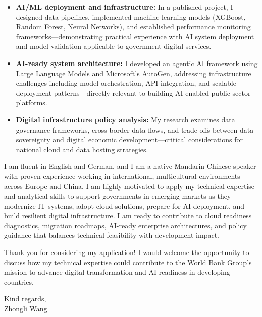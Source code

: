 \documentclass[11pt]{article}
\begin{document}
\begin{itemize}
    \item \textbf{AI/ML deployment and infrastructure:} In a published project, I designed data pipelines, implemented machine learning models (XGBoost, Random Forest, Neural Networks), and established performance monitoring frameworks—demonstrating practical experience with AI system deployment and model validation applicable to government digital services.
    \item \textbf{AI-ready system architecture:} I developed an agentic AI framework using Large Language Models and Microsoft's AutoGen, addressing infrastructure challenges including model orchestration, API integration, and scalable deployment patterns—directly relevant to building AI-enabled public sector platforms.
    \item \textbf{Digital infrastructure policy analysis:} My research examines data governance frameworks, cross-border data flows, and trade-offs between data sovereignty and digital economic development—critical considerations for national cloud and data hosting strategies.
\end{itemize}

I am fluent in English and German, and I am a native Mandarin Chinese speaker with proven experience working in international, multicultural environments across Europe and China. 
I am highly motivated to apply my technical expertise and analytical skills to support governments in emerging markets as they modernize IT systems, adopt cloud solutions, prepare for AI deployment, and build resilient digital infrastructure. 
I am ready to contribute to cloud readiness diagnostics, migration roadmaps, AI-ready enterprise architectures, and policy guidance that balances technical feasibility with development impact.

Thank you for considering my application! 
I would welcome the opportunity to discuss how my technical expertise could contribute to the World Bank Group's mission to advance digital transformation and AI readiness in developing countries.

\vspace{0.08cm}
\noindent Kind regards, \\
\noindent Zhongli Wang

\end{document}
